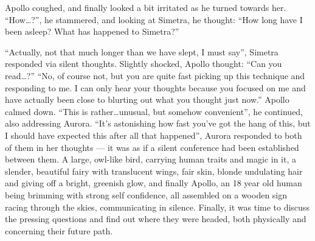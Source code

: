 Apollo coughed, and finally looked a bit irritated as he turned towards her. \enquote{How\dots?}, he stammered, and looking at Simetra, he thought: \enquote{How long have I been asleep? What has happened to Simetra?}

\enquote{Actually, not that much longer than we have slept, I must say}, Simetra responded via silent thoughts. Slightly shocked, Apollo thought: \enquote{Can you read\dots?} \enquote{No, of course not, but you are quite fast picking up this technique and responding to me. I can only hear your thoughts because you focused on me and have actually been close to blurting out what you thought just now.}
Apollo calmed down. \enquote{This is rather\dots unusual, but somehow convenient}, he continued, also addressing Aurora. \enquote{It's astonishing how fast you've got the hang of this, but I should have expected this after all that happened}, Aurora responded to both of them in her thoughts --- it was as if a silent conference had been established between them. A large, owl-like bird, carrying human traits and magic in it, a slender, beautiful fairy with translucent wings, fair skin, blonde undulating hair and giving off a bright, greenish glow, and finally Apollo, an 18 year old human being brimming with strong self confidence, all assembled on a wooden sign racing through the skies, communicating in silence. Finally, it was time to discuss the pressing questions and find out where they were headed, both physically and concerning their future path.
